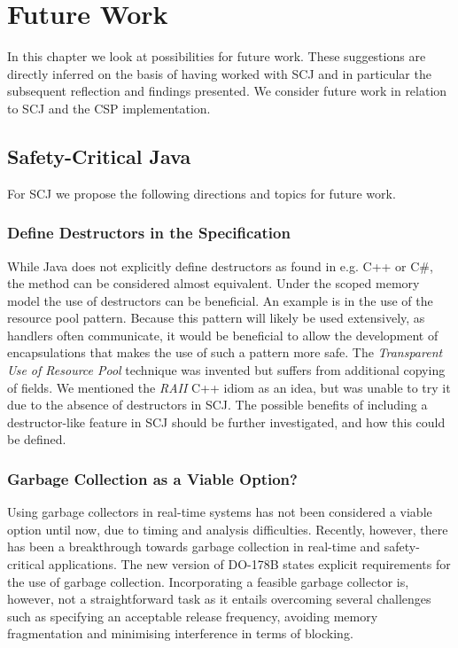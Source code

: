 \chapter{Future Work}
\label{chapter:FutureWorks}
In this chapter we look at possibilities for future work. These suggestions are directly inferred on the basis of having worked with SCJ and in particular the subsequent reflection and findings presented. We consider future work in relation to SCJ and the CSP implementation.

\section{Safety-Critical Java} %
\label{sec:scjfuture}
For SCJ we propose the following directions and topics for future work.

\subsection{Define Destructors in the Specification}
While Java does not explicitly define destructors as found in e.g. C++ or C\#, the  method can be considered almost equivalent. Under the scoped memory model the use of destructors can be beneficial. An example is in the use of the resource pool pattern. Because this pattern will likely be used extensively, as handlers often communicate, it would be beneficial to allow the development of encapsulations that makes the use of such a pattern more safe. The \textit{Transparent Use of Resource Pool} technique was invented but suffers from additional copying of fields. We mentioned the \textit{RAII} C++ idiom as an idea, but was unable to try it due to the absence of destructors in SCJ. The possible benefits of including a destructor-like feature in SCJ should be further investigated, and how this could be defined.

\subsection{Garbage Collection as a Viable Option?} %
\label{sub:garbage_collection_as_a_viable_option}
Using garbage collectors in real-time systems has not been considered a viable option until now, due to timing and analysis difficulties. Recently, however, there has been a breakthrough towards garbage collection in real-time and safety-critical applications. The new version of DO-178B states explicit requirements for the use of garbage collection. Incorporating a feasible garbage collector is, however, not a straightforward task as it entails overcoming several challenges such as specifying an acceptable release frequency, avoiding memory fragmentation and minimising interference in terms of blocking.

